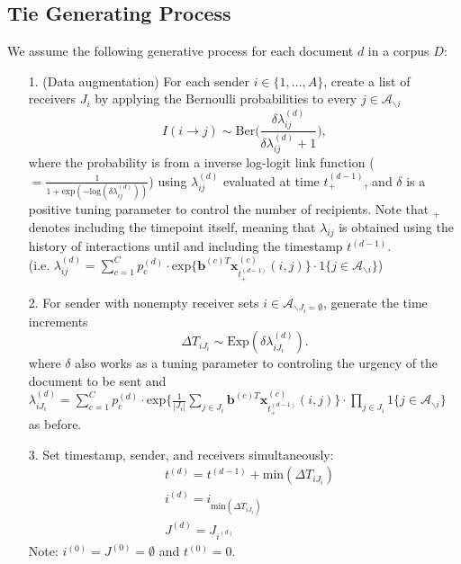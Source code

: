 \documentclass[a4paper]{article}
\begin{document}
\subsection{Tie Generating Process}\label{subsec: Tie Generating Process}
We assume the following generative process for each document $d$ in a corpus $D$:
\begin{itemize}
	\item[1.] (Data augmentation) For each sender $i \in \{1,...,A\}$, create a list of receivers $J_i$ by applying the Bernoulli probabilities to every $j \in \mathcal{A}_{\backslash i}$
	\begin{equation} I(i \rightarrow j) \sim \mbox{Ber}\Big(\frac{\delta\lambda^{(d)}_{ij}}{\delta\lambda^{(d)}_{ij}+1}\Big),
	\end{equation}
	where the probability is from a inverse log-logit link function ($=\frac{1}{1 + \mbox{exp}(-\mbox{log}(\delta\lambda^{(d)}_{ij}))}$) using $\lambda^{(d)}_{ij}$ evaluated at time $t_+^{(d-1)}$, and $\delta$ is a positive tuning parameter to control the number of recipients. Note that $_+$ denotes including the timepoint itself, meaning that $\lambda_{ij}$ is obtained using the history of interactions until and including the timestamp $t^{(d-1)}$. \\(i.e. $\lambda^{(d)}_{ij}=\sum\limits_{c=1}^{C} p^{(d)}_c\cdot\mbox{exp}\Big\{\boldsymbol{b}^{(c)T}\boldsymbol{x}^{(c)}_{t^{(d-1)}_+}(i, j)\Big\}\cdot 1\{j \in \mathcal{A}_{\backslash i}\}$)
	\item[2.] For sender with nonempty receiver sets $i \in \mathcal{A}_{\backslash J_i=\emptyset}$, generate the time increments \begin{equation}
\Delta T_{i{J_i}} \sim \mbox{Exp}(\delta\lambda_{i{J_i}}^{(d)}).
	\end{equation}
	where $\delta$ also works as a tuning parameter to controling the urgency of the document to be sent and $\lambda^{(d)}_{i{J_i}}= \sum\limits_{c=1}^{C} p^{(d)}_c\cdot\mbox{exp}\Big\{\frac{1}{|J_i|}\sum\limits_{j \in{J_i}}\boldsymbol{b}^{(c)T}\boldsymbol{x}^{(c)}_{t^{(d-1)}_+}(i, j)\Big\}\cdot \prod\limits_{j \in J_i}1\{j \in \mathcal{A}_{\backslash i}\}$ as before.
	 	 \item[3.] Set timestamp, sender, and receivers simultaneously:
	 	 \begin{equation}
	 	 \begin{aligned}
	 	 &t^{(d)} = t^{(d-1)}+\mbox{min}(\Delta T_{i{J_i}})\\
	 	  &i^{(d)} = i_{\mbox{min}(\Delta T_{i{J_i}})} \\
	 	  &J^{(d)} = J_{i^{(d)}}
	 	  \end{aligned}
	 	 \end{equation} Note: $i^{(0)}=J^{(0)}=\emptyset$ and $t^{(0)}=0$.
\end{itemize}
\iffalse
\end{document}
